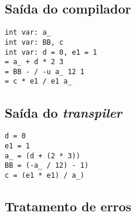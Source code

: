 \documentclass{sftex/sftex}
\begin{document}
\subsection{Saída do compilador}

\begin{verbatim}
int var: a_
int var: BB, c
int var: d = 0, e1 = 1
= a_ + d * 2 3
= BB - / -u a_ 12 1
= c * e1 / e1 a_
\end{verbatim}

\subsection{Saída do \emph{transpiler}}

\begin{verbatim}
d = 0
e1 = 1
a_ = (d + (2 * 3))
BB = (-a_ / 12) - 1)
c = (e1 * e1) / a_)
\end{verbatim}

\subsection{Tratamento de erros}
\end{document}
